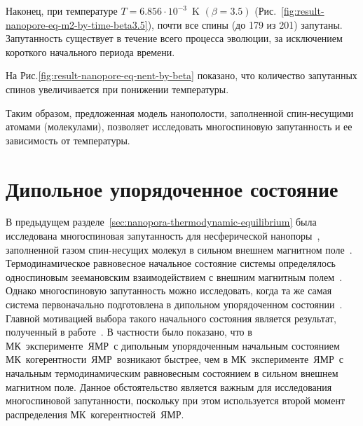 Наконец, при температуре ${T= 6.856\cdot10^{-3}}$~K $(\beta=3.5)$ (Рис.~\ref{fig:result-nanopore-eq-m2-by-time-beta3.5}), почти все спины (до 179 из 201) запутаны. Запутанность существует в течение всего процесса эволюции, за исключением короткого начального периода времени.

На Рис.\ref{fig:result-nanopore-eq-nent-by-beta} показано, что количество запутанных спинов увеличивается при понижении температуры.


Таким образом, предложенная модель нанополости, заполненной спин-несущими атомами (молекулами), позволяет исследовать многоспиновую запутанность и ее зависимость от температуры.




\section{Дипольное упорядоченное состояние}
\label{sec:1}

В предыдущем разделе~\ref{sec:nanopora-thermodynamic-equilibrium} была исследована многоспиновая запутанность для несферической нанопоры~\cite{Doronin2019},
заполненной газом  спин-несущих молекул в сильном внешнем магнитном поле~\cite{Baugh2001,Doronin2009}.
Термодинамическое равновесное начальное состояние системы определялось односпиновым зеемановским взаимодействием с внешним магнитным полем~\cite{Doronin2007a}.
Однако  многоспиновую запутанность можно  исследовать,
когда та же самая система первоначально подготовлена в дипольном упорядоченном состоянии~\cite{Goldman1970}.
Главной мотивацией выбора такого начального состояния является результат, полученный в работе~\cite{Doronin2011}.
В частности было показано, что в МК~эксперименте~ЯМР~с дипольным упорядоченным начальным состоянием МК~когерентности~ЯМР~возникают быстрее,
чем в МК~эксперименте~ЯМР~с начальным термодинамическим равновесным состоянием в сильном внешнем магнитном поле.
Данное обстоятельство является важным для исследования многоспиновой запутанности,
поскольку при этом используется второй момент распределения МК~когерентностей~ЯМР.

